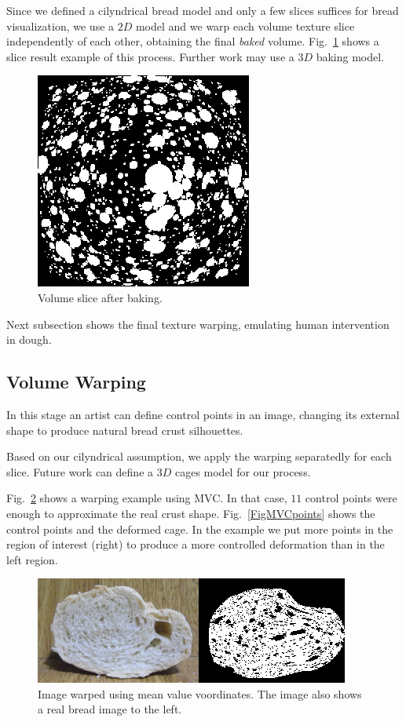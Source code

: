 \documentclass[final,5p,times]{elsarticle}
\begin{document}
Since we defined a cilyndrical bread model and only a few slices suffices for bread visualization, we use a $2D$ model and we warp each volume texture slice independently of each other, obtaining the final {\em baked} volume. Fig.~\ref{FigBaking} shows a slice result example of this process. Further work may use a $3D$ baking model.  

\begin{figure}
\includegraphics[scale=0.95]{baking.png}
\caption{Volume slice after baking.}
\label{FigBaking}
\end{figure}

Next subsection shows the final texture warping, emulating human intervention in dough.


\subsection{Volume Warping}
In this stage an artist can define control points in an image, changing its external shape to produce natural bread crust silhouettes. 


Based on our cilyndrical assumption, we apply the warping separatedly for each slice. Future work can define a $3D$ cages model for our process.


Fig.~\ref{FigMVC} shows a warping example using MVC. In that case, $11$ control points were enough to approximate the real crust shape. Fig.~\ref{FigMVCpoints} shows the control points and the deformed cage. In the example we put more points in the region of interest (right) to produce a more controlled deformation than in the left region.

\begin{figure}[!ht]
\includegraphics[scale=0.65]{warping.png}
\caption{Image warped using mean value voordinates. The image also shows a real bread image to the left. }
\label{FigMVC}
\end{figure}
\end{document}
